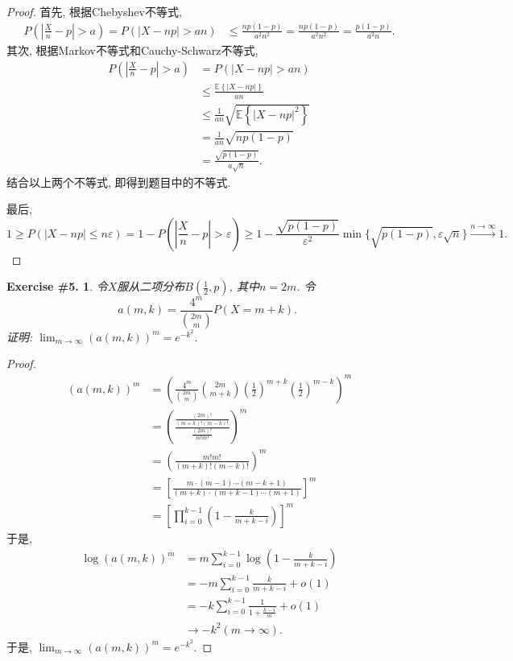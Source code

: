 \documentclass[UTF8, a4paper]{article}
\newtheorem{exercise}{Exercise \#5.}
\begin{document}
\begin{proof}
首先, 
根据Chebyshev不等式,
$$
\begin{aligned}
    P\left(\left|\frac{X}{n}-p\right|>a\right) = P\left(\left|X-np\right|>an\right) &\leq \frac{np(1 - p)}{a^2 n^2} = \frac{np(1-p)}{a^2 n^2} = \frac{p(1-p)}{a^2 n}.
\end{aligned}
$$
其次, 根据Markov不等式和Cauchy-Schwarz不等式,
$$
\begin{aligned}
    P\left(\left|\frac{X}{n}-p\right|>a\right) &= P\left(\left|X-np\right|>an\right) \\
    &\leq \frac{\mathbb{E}\left\{\left|X-np\right|\right\}}{an} \\
    &\leq \frac{1}{a n} \sqrt{\mathbb{E}\left\{\left|X-np\right|^2\right\}} \\
    &= \frac{{1}}{a n} \sqrt{np(1-p)} \\
    &= \frac{\sqrt{p(1-p)}}{a\sqrt{n}}.
\end{aligned}
$$
结合以上两个不等式, 即得到题目中的不等式.


最后, 
$$
1 \geq P(|X - np| \leq n\varepsilon) = 1 - P\left(\left|\frac{X}{n}-p\right|> \varepsilon\right) \geq 1 - \frac{\sqrt{p(1-p)}}{\varepsilon^2} \min \{\sqrt{p(1-p)}, \varepsilon \sqrt{n}\} \xrightarrow{n\to \infty} 1.
$$
\end{proof}


\begin{framed}
\begin{exercise}
令\(X\)服从二项分布\(B\left(\frac{1}{2},p\right)\), 其中\(n = 2m\). 令
$$
a(m, k)=\frac{4^m}{\binom{2 m}{m}} P(X=m+k) \text {. }
$$
证明: \(\lim_{m\to \infty} \left(a(m,k)\right)^m = e^{-k^2}\).
\end{exercise}
\end{framed}

\begin{proof}
$$
\begin{aligned}
    \left(a(m,k)\right)^m &= \left(\frac{4^m}{\binom{2m}{m}} \binom{2m}{m+k} \left(\frac{1}{2}\right)^{m+k} \left(\frac{1}{2}\right)^{m-k}\right)^m \\
    &= \left(\frac{\frac{(2m)!}{(m+k)!(m-k)!}}{\frac{(2m)!}{m!m!}}\right)^m \\
    &= \left(\frac{m!m!}{(m+k)!(m-k)!}\right)^m \\
    &= \left[\frac{m \cdot (m - 1) \cdots (m - k + 1)}{(m + k) \cdot (m + k - 1) \cdots (m + 1)}\right]^m \\
    &= \left[\prod_{i = 0}^{k - 1}\left(1 - \frac{k}{m+k - i}\right)\right]^m
\end{aligned}
$$
于是, 
$$
\begin{aligned}
    \log \left(a(m,k)\right)^m &= m \sum_{i = 0}^{k - 1} \log\left(1 - \frac{k}{m+k - i}\right) \\
    &= -m \sum_{i = 0}^{k - 1} \frac{k}{m+k - i} + o\left(1\right) \\
    &= -k \sum_{i = 0}^{k-1} \frac{1}{1 + \frac{k-i}{m}} + o\left(1\right) \\
    &\to -k^2 (m \to \infty).
\end{aligned}
$$
于是, \(\lim_{m\to \infty} \left(a(m,k)\right)^m = e^{-k^2}\).

\end{proof}
\end{document}
